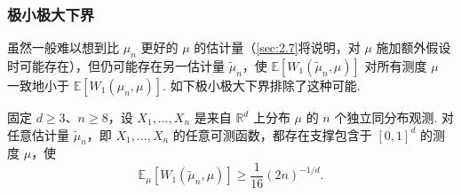 \subsubsection{极小极大下界}\label{sec:2.6.2}
虽然一般难以想到比 $\mu_n$ 更好的 $\mu$ 的估计量（\autoref{sec:2.7}将说明，对 $\mu$ 施加额外假设时可能存在），但仍可能存在另一估计量 $\tilde\mu_n$，使 $\mathbb E[W_1(\tilde\mu_n,\mu)]$ 对所有测度 $\mu$ 一致地小于 $\mathbb E[W_1(\mu_n,\mu)]$. 如下极小极大下界排除了这种可能.
\begin{theorem}\label{thm:2.15}
固定 $d\ge3$、$n\ge8$，设 $X_1,\ldots,X_n$ 是来自 $\mathbb R^d$ 上分布 $\mu$ 的 $n$ 个独立同分布观测. 对任意估计量 $\tilde\mu_n$，即 $X_1,\ldots,X_n$ 的任意可测函数，都存在支撑包含于 $[0,1]^d$ 的测度 $\mu$，使
$$\mathbb E_\mu[W_1(\tilde\mu_n,\mu)]\ge\frac1{16}(2n)^{-1/d}.$$
\end{theorem}
